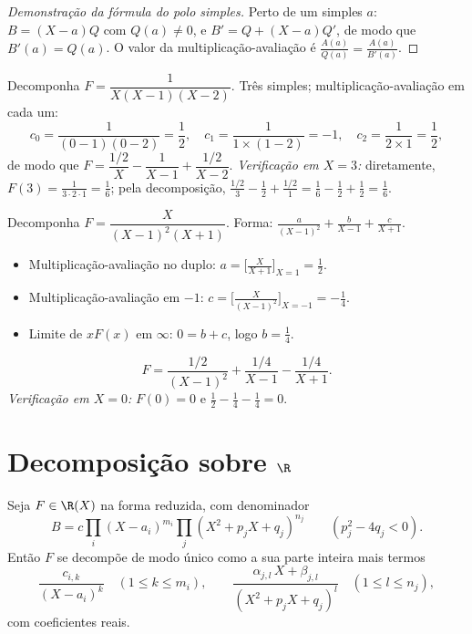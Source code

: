 \begin{proof}[Demonstração da fórmula do polo simples]
Perto de um  simples $a$: $B = (X - a) Q$ com $Q(a) \neq 0$, e $B' =
Q + (X - a) Q'$, de modo que $B'(a) = Q(a)$. O valor da
multiplicação-avaliação é $\frac{A(a)}{Q(a)} = \frac{A(a)}{B'(a)}$.
\end{proof}

\begin{example}\label{ex:b1:fractions:simple}
Decomponha $F = \dfrac{1}{X(X-1)(X-2)}$. Três  simples;
multiplicação-avaliação em cada um:
\[
c_0 = \frac{1}{(0-1)(0-2)} = \frac12,
\quad
c_1 = \frac{1}{1 \times (1 - 2)} = -1,
\quad
c_2 = \frac{1}{2 \times 1} = \frac12,
\]
de modo que $F = \dfrac{1/2}{X} - \dfrac{1}{X-1} + \dfrac{1/2}{X-2}$.
\emph{Verificação em $X = 3$:} diretamente, $F(3) = \frac{1}{3\cdot2\cdot1} =
\frac16$; pela decomposição, $\frac{1/2}{3} - \frac{1}{2} +
\frac{1/2}{1} = \frac16 - \frac12 + \frac12 = \frac16$.
\end{example}

\begin{example}\label{ex:b1:fractions:multiple}
Decomponha $F = \dfrac{X}{(X-1)^2 (X+1)}$. Forma:
$\frac{a}{(X-1)^2} + \frac{b}{X-1} + \frac{c}{X+1}$.
\begin{itemize}
  \item Multiplicação-avaliação no  duplo: $a = \bigl[\frac{X}{X+1}\bigr]_{X=1}
        = \frac12$.
  \item Multiplicação-avaliação em $-1$: $c = \bigl[\frac{X}{(X-1)^2}\bigr]_{X=-1} =
        -\frac14$.
  \item Limite de $xF(x)$ em $\infty$: $0 = b + c$, logo $b = \frac14$.
\end{itemize}
\[
F = \frac{1/2}{(X-1)^2} + \frac{1/4}{X-1} - \frac{1/4}{X+1} .
\]
\emph{Verificação em $X = 0$:} $F(0) = 0$ e $\frac12 - \frac14 - \frac14
= 0$.
\end{example}

\section{Decomposição sobre $\R$}

\begin{theorem}\label{thm:b1:fractions:real}
Seja $F \in \R(X)$ na forma reduzida, com denominador
\[
B = c \prod_i (X - a_i)^{m_i} \prod_j (X^2 + p_j X + q_j)^{n_j}
\qquad (p_j^2 - 4q_j < 0).
\]
Então $F$ se decompõe de modo único como a sua parte inteira mais termos
\[
\frac{c_{i,k}}{(X - a_i)^k} \quad (1 \leq k \leq m_i),
\qquad
\frac{\alpha_{j,l}\, X + \beta_{j,l}}{(X^2 + p_j X + q_j)^{l}}
\quad (1 \leq l \leq n_j),
\]
com coeficientes reais.
\end{theorem}

